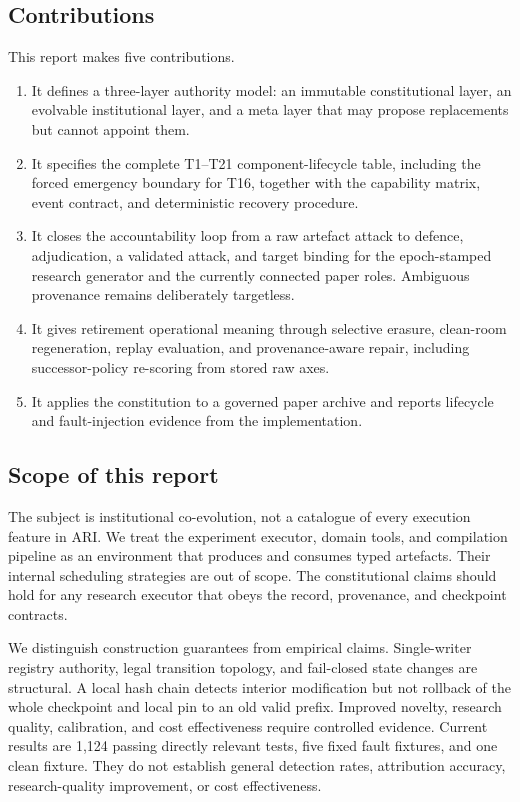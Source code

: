 \subsection{Contributions}\label{sec:intro:contrib}

This report makes five contributions.

\begin{enumerate}
  \item It defines a three-layer authority model: an immutable
        constitutional layer, an evolvable institutional layer, and a
        meta layer that may propose replacements but cannot appoint them.
  \item It specifies the complete T1--T21 component-lifecycle table,
        including the forced emergency boundary for T16, together with the capability
        matrix, event contract, and deterministic recovery procedure.
  \item It closes the accountability loop from a raw artefact attack to
        defence, adjudication, a validated attack, and target binding for
        the epoch-stamped research generator and the currently connected
        paper roles. Ambiguous provenance remains deliberately targetless.
  \item It gives retirement operational meaning through selective
        erasure, clean-room regeneration, replay evaluation, and
        provenance-aware repair, including successor-policy re-scoring
        from stored raw axes.
  \item It applies the constitution to a governed paper archive and
        reports lifecycle and fault-injection evidence from the
        implementation.
\end{enumerate}

\subsection{Scope of this report}\label{sec:intro:scope}

The subject is institutional co-evolution, not a catalogue of every
execution feature in ARI. We treat the experiment executor, domain tools,
and compilation pipeline as an environment that produces and consumes
typed artefacts. Their internal scheduling strategies are out of scope.
The constitutional claims should hold for any research executor that
obeys the record, provenance, and checkpoint contracts.

We distinguish construction guarantees from empirical claims.
Single-writer registry authority, legal transition topology, and
fail-closed state changes are structural. A local hash chain detects
interior modification but not rollback of the whole checkpoint and local
pin to an old valid prefix. Improved
novelty, research quality, calibration, and cost effectiveness require
controlled evidence. Current results are 1,124 passing directly relevant
tests, five fixed fault fixtures, and one clean fixture. They do not
establish general detection rates, attribution accuracy, research-quality
improvement, or cost effectiveness.

